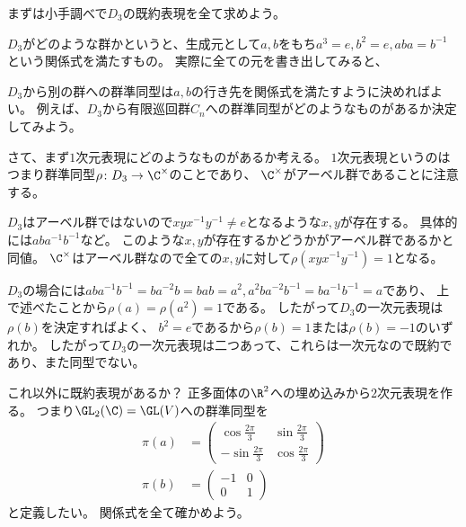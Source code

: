 \documentclass{jsarticle}
\begin{document}
まずは小手調べで$D_3$の既約表現を全て求めよう。

$D_3$がどのような群かというと、生成元として$a,b$をもち$a^3=e, b^2=e, aba=b^{-1}$という関係式を満たすもの。
実際に全ての元を書き出してみると、

$D_3$から別の群への群準同型は$a,b$の行き先を関係式を満たすように決めればよい。
例えば、$D_3$から有限巡回群$C_n$への群準同型がどのようなものがあるか決定してみよう。

さて、まず$1$次元表現にどのようなものがあるか考える。
$1$次元表現というのはつまり群準同型$\rho\colon D_3\to \C^\times$のことであり、
$\C^\times$がアーベル群であることに注意する。

$D_3$はアーベル群ではないので$xyx^{-1}y^{-1}\neq e$となるような$x,y$が存在する。
具体的には$aba^{-1}b^{-1}$など。
このような$x, y$が存在するかどうかがアーベル群であるかと同値。
$\C^\times$はアーベル群なので全ての$x, y$に対して$\rho(xyx^{-1}y^{-1})=1$となる。

$D_3$の場合には$aba^{-1}b^{-1}=ba^{-2}b=bab=a^2, a^2ba^{-2}b^{-1}=ba^{-1}b^{-1}=a$であり、
上で述べたことから$\rho(a)=\rho(a^2)=1$である。
したがって$D_3$の一次元表現は$\rho(b)$を決定すればよく、
$b^2=e$であるから$\rho(b)=1$または$\rho(b)=-1$のいずれか。
したがって$D_3$の一次元表現は二つあって、これらは一次元なので既約であり、また同型でない。

これ以外に既約表現があるか？
正多面体の$\R^2$への埋め込みから$2$次元表現を作る。
つまり$\GL_2(\C)=\GL(V)$への群準同型を
\begin{align*}
\pi(a)&=\begin{pmatrix}\cos \frac{2\pi}{3}&\sin \frac{2\pi}{3}\\-\sin \frac{2\pi}{3}&\cos \frac{2\pi}{3}\end{pmatrix}\\
\pi(b)&=\begin{pmatrix}-1&0\\0&1\end{pmatrix}
\end{align*}
と定義したい。
関係式を全て確かめよう。
\end{document}
